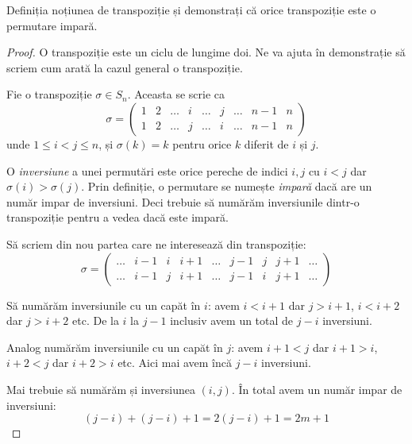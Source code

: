 \begin{exercise}
Definiția noțiunea de transpoziție și demonstrați că orice transpoziție este o permutare impară.
\end{exercise}
\begin{proof}
O transpoziție este un ciclu de lungime doi.
Ne va ajuta în demonstrație să scriem cum arată la cazul general o transpoziție.

Fie o transpoziție \(\sigma \in S_n\). Aceasta se scrie ca
\[
    \sigma = \begin{pmatrix}
        1 & 2 & \dots & i & \dots & j & \dots & n - 1 & n \\
        1 & 2 & \dots & j & \dots & i & \dots & n - 1 & n
    \end{pmatrix}
\]
unde \(1 \leq i < j \leq n\), și \(\sigma(k) = k\) pentru orice \(k\) diferit de \(i\) și \(j\).

O \emph{inversiune} a unei permutări este orice pereche de indici \(i, j\) cu \(i < j\) dar \(\sigma(i) > \sigma(j)\).
Prin definiție, o permutare se numește \emph{impară} dacă are un număr impar de inversiuni.
Deci trebuie să numărăm inversiunile dintr-o transpoziție pentru a vedea dacă este impară.

Să scriem din nou partea care ne interesează din transpoziție:
\[
    \sigma = \begin{pmatrix}
        \dots & i - 1 & i & i + 1 & \dots & j - 1 & j & j + 1 & \dots \\
        \dots & i - 1 & j & i + 1 & \dots & j - 1 & i & j + 1 & \dots
    \end{pmatrix}
\]

Să numărăm inversiunile cu un capăt în \(i\): avem \(i < i + 1\) dar \(j > i + 1\), \(i < i + 2\) dar \(j > i + 2\) etc. De la \(i\) la \(j - 1\) inclusiv avem un total de \(j - i\) inversiuni.

Analog numărăm inversiunile cu un capăt în \(j\): avem \(i + 1 < j\) dar \(i + 1 > i\), \(i + 2 < j\) dar \(i + 2 > i\) etc. Aici mai avem încă \(j - i\) inversiuni.

Mai trebuie să numărăm și inversiunea \((i, j)\). În total avem un număr impar de inversiuni:
\[
    (j - i) + (j - i) + 1 = 2 (j - i) + 1 = 2m + 1
\]
\end{proof}

